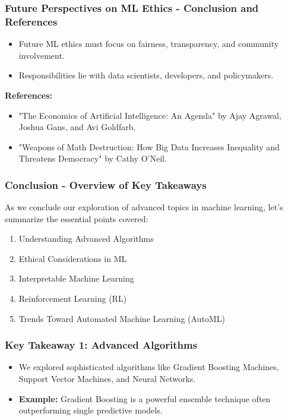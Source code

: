 \documentclass[aspectratio=169]{beamer}
\begin{document}
\begin{frame}[fragile]
  \frametitle{Future Perspectives on ML Ethics - Conclusion and References}
  \begin{itemize}
    \item Future ML ethics must focus on fairness, transparency, and community involvement.
    \item Responsibilities lie with data scientists, developers, and policymakers.
  \end{itemize}

  \textbf{References:}
  \begin{itemize}
    \item "The Economics of Artificial Intelligence: An Agenda" by Ajay Agrawal, Joshua Gans, and Avi Goldfarb.
    \item "Weapons of Math Destruction: How Big Data Increases Inequality and Threatens Democracy" by Cathy O'Neil.
  \end{itemize}
\end{frame}

\begin{frame}[fragile]
    \frametitle{Conclusion - Overview of Key Takeaways}
    As we conclude our exploration of advanced topics in machine learning, let's summarize the essential points covered:
    \begin{enumerate}
        \item Understanding Advanced Algorithms
        \item Ethical Considerations in ML
        \item Interpretable Machine Learning
        \item Reinforcement Learning (RL)
        \item Trends Toward Automated Machine Learning (AutoML)
    \end{enumerate}
\end{frame}

\begin{frame}[fragile]
    \frametitle{Key Takeaway 1: Advanced Algorithms}
    \begin{itemize}
        \item We explored sophisticated algorithms like Gradient Boosting Machines, Support Vector Machines, and Neural Networks.
        \item \textbf{Example:} Gradient Boosting is a powerful ensemble technique often outperforming single predictive models.
    \end{itemize}
\end{frame}
\end{document}
